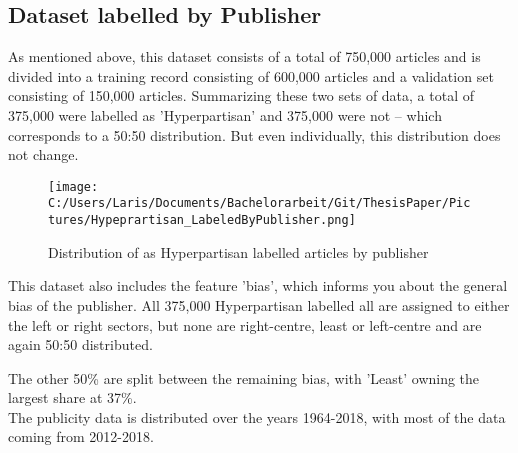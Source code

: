 \documentclass[a4paper, 11pt,titlepage,oneside,openany]{book}
\begin{document}
\subsection{Dataset labelled by Publisher}
As mentioned above, this dataset consists of a total of 750,000 articles and is divided into a training record consisting of 600,000 articles and a validation set consisting of 150,000 articles. Summarizing these two sets of data, a total of 375,000 were labelled as 'Hyperpartisan' and 375,000 were not – which corresponds to a 50:50 distribution. But even individually, this distribution does not change. 
\begin{figure}[h]
	\centering
	\texttt{[image: C:/Users/Laris/Documents/Bachelorarbeit/Git/ThesisPaper/Pictures/Hypeprartisan\_LabeledByPublisher.png]}
	\caption{Distribution of as Hyperpartisan labelled articles by publisher}
	\label{fig:example}
\end{figure}

\noindent This dataset also includes the feature 'bias', which informs you about the general bias of the publisher. All 375,000 Hyperpartisan labelled all are assigned to either the left or right sectors, but none are right-centre, least or left-centre and are again 50:50 distributed.


\noindent The other 50\% are split between the remaining bias, with 'Least' owning the largest share at 37\%.\\
The publicity data is distributed over the years 1964-2018, with most of the data coming from 2012-2018.
\begin{figure}[h]
\end{figure}
\end{document}
